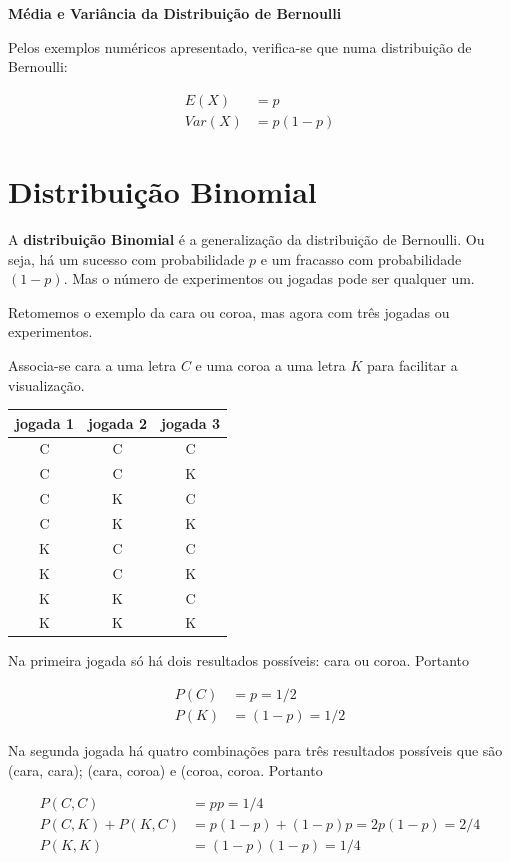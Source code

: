 \documentclass[
]{book}
\begin{document}
\textbf{Média e Variância da Distribuição de Bernoulli}

Pelos exemplos numéricos apresentado, verifica-se que numa distribuição de Bernoulli:

\begin{align}
  E(X) &= p \\
  Var(X) &= p(1-p)
\end{align}

\hypertarget{distribuiuxe7uxe3o-binomial}{%
\section{Distribuição Binomial}\label{distribuiuxe7uxe3o-binomial}}

A \textbf{distribuição Binomial} é a generalização da distribuição de Bernoulli. Ou seja,
há um sucesso com probabilidade \(p\) e um fracasso com probabilidade \((1-p)\). Mas o número de experimentos ou jogadas pode ser qualquer um.

Retomemos o exemplo da cara ou coroa, mas agora com três jogadas ou experimentos.

Associa-se cara a uma letra \(C\) e uma coroa a uma letra \(K\) para facilitar a
visualização.

\begin{longtable}[]{@{}ccc@{}}
\toprule
jogada 1 & jogada 2 & jogada 3\tabularnewline
\midrule
\endhead
C & C & C\tabularnewline
C & C & K\tabularnewline
C & K & C\tabularnewline
C & K & K\tabularnewline
K & C & C\tabularnewline
K & C & K\tabularnewline
K & K & C\tabularnewline
K & K & K\tabularnewline
\bottomrule
\end{longtable}

Na primeira jogada só há dois resultados possíveis: cara ou coroa. Portanto

\begin{align*}
  P(C) &= p = 1/2 \\
  P(K) &= (1-p) = 1/2
\end{align*}

Na segunda jogada há quatro combinações para três resultados possíveis que são (cara, cara); (cara, coroa) e (coroa, coroa. Portanto

\begin{align*}
  P(C,C) &= pp = 1/4 \\
  P(C,K) + P(K,C) &= p(1-p) + (1-p)p = 2p(1-p) = 2/4\\
  P(K,K) &= (1-p)(1-p) = 1/4
\end{align*}
\end{document}

